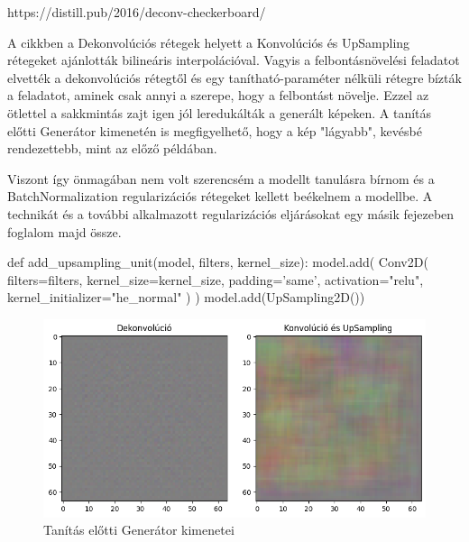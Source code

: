 https://distill.pub/2016/deconv-checkerboard/

A cikkben a Dekonvolúciós rétegek helyett a Konvolúciós és UpSampling rétegeket ajánlották bilineáris interpolációval. Vagyis a felbontásnövelési feladatot elvették a dekonvolúciós rétegtől és egy tanítható-paraméter nélküli rétegre bízták a feladatot, aminek csak annyi a szerepe, hogy a felbontást növelje. Ezzel az ötlettel a sakkmintás zajt igen jól leredukálták a generált képeken. A tanítás előtti Generátor kimenetén is megfigyelhető, hogy a kép "lágyabb", kevésbé rendezettebb, mint az előző példában.

Viszont így önmagában nem volt szerencsém a modellt tanulásra bírnom és a BatchNormalization regularizációs rétegeket kellett beékelnem a modellbe. A technikát és a további alkalmazott regularizációs eljárásokat egy másik fejezeben foglalom majd össze.

\begin{python}
def add_upsampling_unit(model,
                        filters, kernel_size):
    model.add(
        Conv2D(
            filters=filters,
            kernel_size=kernel_size,
            padding='same',
            activation="relu",
            kernel_initializer="he_normal"
        )
    )
    model.add(UpSampling2D())
\end{python}

\begin{figure}[h]
\centering
\includegraphics[width=13cm]{images/deconv-vs-conv_upsmpl.png}
\caption{Tanítás előtti Generátor kimenetei}
\label{fig:deconv-vs-conv_upsmpl}
\end{figure}
